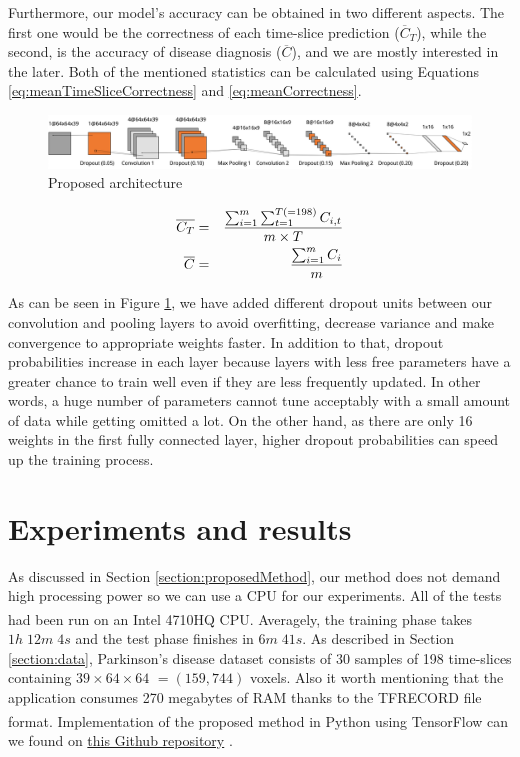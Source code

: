 \documentclass[preprint,12pt]{elsarticle}
\begin{document}
Furthermore, our model's accuracy can be obtained in two different aspects. The first one would be the correctness of each time-slice prediction ($\overline{C}_{T}$), while the second, is the accuracy of disease diagnosis ($\overline{C}$), and we are mostly interested in the later. Both of the mentioned statistics can be calculated using Equations \eqref{eq:meanTimeSliceCorrectness} and \eqref{eq:meanCorrectness}.


\begin{figure}
	\includegraphics[width=\linewidth]{images/cnnArchHorizontal}
	\caption{Proposed architecture}
	\label{fig:cnnHorizontalArch}
\end{figure}

\begin{eqnarray}
\label{eq:meanTimeSliceCorrectness}
\overline{C_{T}} &=& {{\sum_{i=1}^{m} \sum_{t=1}^{T (=198)} C_{i,t} } \over {m \times T} } \\ 
\label{eq:meanCorrectness}
\overline{C} &=& {{\sum_{i=1}^{m} C_i } \over {m } } 
\end{eqnarray}



As can be seen in Figure \ref{fig:cnnHorizontalArch}, we have added different dropout units between our convolution and pooling layers to avoid overfitting, decrease variance and make convergence to appropriate weights faster. In addition to that, dropout probabilities increase in each layer because layers with less free parameters have a greater chance to train well even if they are less frequently updated. In other words, a huge number of parameters cannot tune acceptably with a small amount of data while getting omitted a lot. On the other hand, as there are only 16 weights in the first fully connected layer, higher dropout probabilities can speed up the training process.






\section{Experiments and results}
\label{section:results}
As discussed in Section \ref{section:proposedMethod}, our method does not demand high processing power so we can use a CPU for our experiments. All of the tests had been run on an Intel\textsuperscript{\tiny\textregistered} 4710HQ CPU. Averagely, the training phase takes $1h \; 12m \; 4s$ and the test phase finishes in $6m \; 41s$. As described in Section \ref{section:data}, Parkinson's disease dataset consists of 30 samples of 198 time-slices containing \texttt{$39 \times 64 \times 64$} {\tiny $=(159,744)$} voxels. Also it worth mentioning that the application consumes 270 megabytes of RAM thanks to the TFRECORD file format. Implementation of the proposed method in Python using TensorFlow\textsuperscript{\tiny\textregistered} can we found on \href{https://github.com/amin-amini/BayseanFmriDiseaseDiagnosis}{this Github repository} \cite{SourceCode}.
\end{document}
